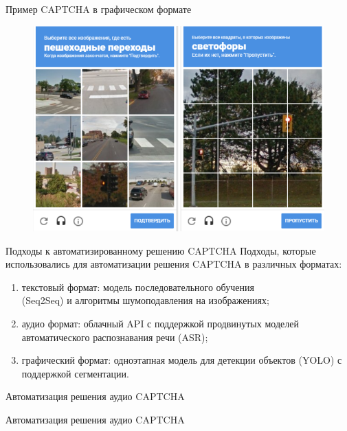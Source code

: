 \documentclass[12pt,a4paper,mathserif]{beamer}
\begin{document}
\begin{frame}{Пример CAPTCHA в графическом формате}
    \begin{figure}
        \centering
        \includegraphics[width=0.75\linewidth]{imgs/image-captcha.png}
    \end{figure}
\end{frame}

\begin{frame}{\large Подходы к автоматизированному решению CAPTCHA}
    \setlength{\parindent}{0.5cm}
    Подходы, которые использовались для автоматизации решения CAPTCHA в различных 
    форматах:

    \begin{enumerate}
        \item текстовый формат: модель последовательного обучения \\(Seq2Seq) и 
        алгоритмы шумоподавления на изображениях;
        \item аудио формат: облачный API с поддержкой продвинутых моделей 
        автоматического распознавания речи (ASR);
        \item графический формат: одноэтапная модель для детекции объектов (YOLO) 
        с поддержкой сегментации.
    \end{enumerate}
\end{frame}

\begin{frame}{Автоматизация решения аудио CAPTCHA}
    \setlength{\parindent}{0.5cm}
    
\end{frame}

\begin{frame}{Автоматизация решения аудио CAPTCHA}
    \setlength{\parindent}{0.5cm}
    
\end{frame}
\end{document}
